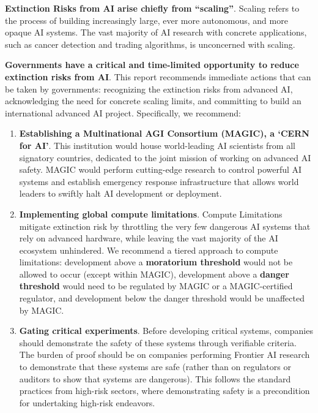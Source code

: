 \documentclass[12pt,a4paper]{article}
\begin{document}
\textbf{Extinction Risks from AI arise chiefly from “scaling”}. Scaling refers to the process of building increasingly large, ever more autonomous, and more opaque AI systems. The vast majority of AI research with concrete applications, such as cancer detection and trading algorithms, is unconcerned with scaling. 

\textbf{Governments have a critical and time-limited opportunity to reduce extinction risks from AI}.  This report recommends immediate actions that can be taken by governments: recognizing the extinction risks from advanced AI, acknowledging the need for concrete scaling limits, and committing to build an international advanced AI project. Specifically, we recommend:

\begin{enumerate}
    \item \textbf{Establishing a Multinational AGI Consortium (MAGIC), a ‘CERN for AI’}. This institution would house world-leading AI scientists from all signatory countries, dedicated to the joint mission of working on advanced AI safety. MAGIC would perform cutting-edge research to control powerful AI systems and establish emergency response infrastructure that allows world leaders to swiftly halt AI development or deployment. 
    \item \textbf{Implementing global compute limitations}. Compute Limitations mitigate extinction risk by throttling the very few dangerous AI systems that rely on advanced hardware, while leaving the vast majority of the AI ecosystem unhindered. We recommend a tiered approach to compute limitations: development above a \textbf{moratorium threshold} would not be allowed to occur (except within MAGIC), development above a \textbf{danger threshold} would need to be regulated by MAGIC or a MAGIC-certified regulator, and development below the danger threshold would be unaffected by MAGIC. 
    \item \textbf{Gating critical experiments}. Before developing critical systems, companies should demonstrate the safety of these systems through verifiable criteria. The burden of proof should be on companies performing Frontier AI research to demonstrate that these systems are safe (rather than on regulators or auditors to show that systems are dangerous). This follows the standard practices from high-risk sectors, where demonstrating safety is a precondition for undertaking high-risk endeavors.

\end{enumerate}
\end{document}
